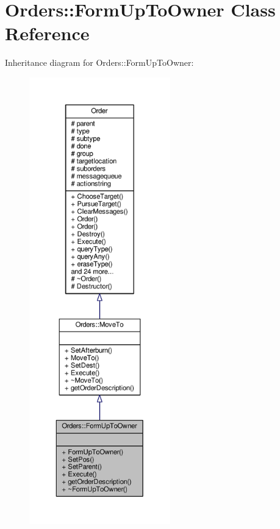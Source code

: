 \hypertarget{classOrders_1_1FormUpToOwner}{}\section{Orders\+:\+:Form\+Up\+To\+Owner Class Reference}
\label{classOrders_1_1FormUpToOwner}


Inheritance diagram for Orders\+:\+:Form\+Up\+To\+Owner\+:
\nopagebreak
\begin{figure}[H]
\begin{center}
\leavevmode
\includegraphics[height=550pt]{d5/dd3/classOrders_1_1FormUpToOwner__inherit__graph}
\end{center}
\end{figure}


